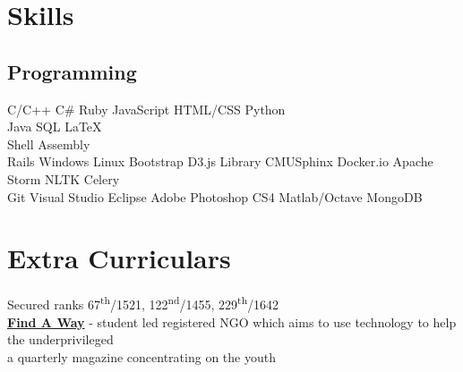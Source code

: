 \documentclass[]{deedy-resume-openfont}
\begin{document}
\begin{minipage}[t]{0.33\textwidth}
\section{Skills}
\subsection{Programming}
C/C++ \textbullet{}   C\# \textbullet{} Ruby \textbullet{} JavaScript \textbullet{} HTML/CSS \textbullet{} Python\\ 
Java \textbullet{} SQL \textbullet{} \LaTeX\ \\
Shell \textbullet{} Assembly \\
Rails \textbullet{} Windows \textbullet{} Linux \textbullet{} Bootstrap \textbullet{} D3.js Library \textbullet{} CMUSphinx \textbullet{} Docker.io \textbullet{} Apache Storm \textbullet{} NLTK \textbullet{} Celery \\
Git \textbullet{} Visual Studio \textbullet{} Eclipse \textbullet{} Adobe Photoshop CS4 \textbullet{} Matlab/Octave \textbullet{} MongoDB
\sectionsep


\section{Extra Curriculars}
 Secured ranks 67\textsuperscript{th}/1521, 122\textsuperscript{nd}/1455, 229\textsuperscript{th}/1642\\\vspace{6pt}
\vspace{6pt}
 \textbf{\href{http://findaway.in/}{Find A Way}} - student led registered NGO which aims to use technology to help the underprivileged\\\vspace{6pt}
 a quarterly magazine concentrating on the youth



%
%

\end{minipage} 
\end{document}
